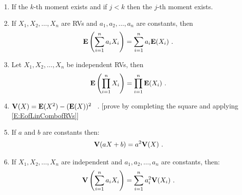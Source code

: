 \begin{enumerate}
\item If the $k$-th moment exists and if $j<k$ then the $j$-th moment exists.

\item If $X_1,X_2,\ldots,X_n$ are RVs and $a_1,a_2,\ldots,a_n$ are constants, then 
\begin{equation}\label{E:EofLinCombofRVs}
\e \left( \sum_{i=1}^n a_i X_i \right) = \sum_{i=1}^n a_i \e(X_i) \ .
\end{equation}
\item Let $X_1,X_2,\ldots,X_n$ be independent RVs, then
\begin{equation}\label{E:EofProdIndRVs}
\e \left(  \prod_{i=1}^n X_i \right) = \prod_{i=1}^{n} \e(X_i) \ .
\end{equation}
\item $\mathbf{V}(X) = \mathbf{E}(X^2) - (\mathbf{E}(X))^2$ \ . [prove by completing the square and applying \eqref{E:EofLinCombofRVs}]
\item If $a$ and $b$ are constants then:
\begin{equation}\label{E:VofAffineofRVs}
\mathbf{V}(aX+b) = a^2\mathbf{V}(X) \ . 
\end{equation}
\item If $X_1,X_2,\ldots,X_n$ are independent and $a_1,a_2,\ldots,a_n$ are constants, then:
\begin{equation}\label{E:VofLinCombofRVs}
\V \left(  \sum_{i=1}^n a_i X_i \right) = \sum_{i=1}^n a_i^2 \V(X_i) \ .
\end{equation}
\end{enumerate}

